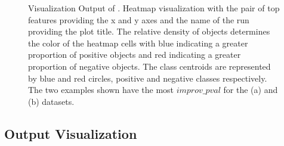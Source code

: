 \begin{figure}[h]
\centering %
\vspace{-3mm}
\vspace{-5mm}
\caption{Visualization Output of \genviz. Heatmap visualization with the pair of top features providing the x and y axes and the name of the run providing the plot title. The relative density of objects determines the color of the heatmap cells with blue indicating a greater proportion of positive objects and red indicating a greater proportion of negative objects. The class centroids are represented by blue and red circles, positive and negative classes respectively. The two examples shown have the most $improv\_pval$ for the (a) \msig and (b) \lincs datasets. }
\vspace{-5mm}
\label{fig:viz}
\end{figure}


\subsection{Output Visualization}\label{ssec:viz}

